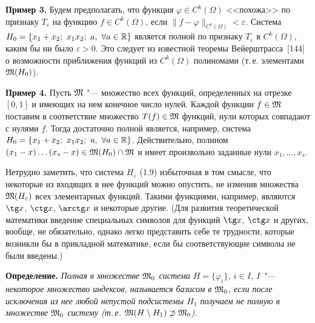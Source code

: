 {\small
\noindent\textbf{Пример 3.} Будем предполагать, что функция
$\varphi\in C^k(\Omega)$ <<похожа>> по признаку $T_\varepsilon$ на функцию
$f\in C^k(\Omega)$, если $\|f-\varphi\|_{C^k(\Omega)}<\varepsilon$. Система
$H_0=\{x_1+x_2;\ x_1x_2;\ a,\ \forall a\in\mathbb R\}$ является полной по
признаку $T_\varepsilon$ в $C^k(\Omega)$, каким бы ни было
$\varepsilon>0$. Это следует из известной теоремы Вейерштрасса~[144]
о возможности приближения функций из $C^k(\Omega)$ полиномами (т.\,е.
элементами $\mathfrak M(H_0)$).

\noindent\textbf{Пример 4.} Пусть $\mathfrak M$ "--- множество всех функций,
определенных на отрезке $[0,1]$ и имеющих на нем конечное число нулей.
Каждой функции $f\in\mathfrak M$ поставим в соответствие множество $T(f)\in\mathfrak M$
функций, нули которых совпадают с нулями $f$. Тогда достаточно полной
является, например, система $H_0=\{x_1+x_2;\ x_1x_2;\ a,\ \forall a\in\mathbb R\}$.
Действительно, полином $(x_1-x)\dots(x_s-x)\in\mathfrak M(H_0)\cap\mathfrak M$ и имеет
произвольно заданные нули $x_1,\dots,x_s$.\par}

Нетрудно заметить, что система $H_\varepsilon$ (1.9) избыточная в том
смысле, что некоторые из входящих в нее функций можно опустить, не изменив
множества $\mathfrak M(H_\varepsilon)$ всех элементарных функций. Такими функциями,
например, являются $\tg x$, $\ctg x$, $\arctg x$ и некоторые другие. (Для
развития теоретической математики введение специальных символов для
функций $\tg x$, $\ctg x$ и других, вообще, не обязательно, однако легко
представить себе те трудности, которые возникли бы в прикладной
математике, если бы соответствующие символы не были введены.)

\textbf{Определение.} \emph{Полная в множестве $\mathfrak M_0$ система
$H=\{\varphi_i\}$, $i\in I$, $I$ "--- некоторое множество индексов,
называется базисом в $\mathfrak M_0$, если после исключения из нее любой непустой
подсистемы $H_1$ получаем не полную в множестве $\mathfrak M_0$ систему (т.\,е.
$\mathfrak M(H\setminus H_1)\not\supset\mathfrak M_0$).}

